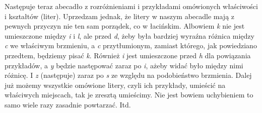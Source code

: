 \documentclass[dvipsnames,12pt]{article}
\begin{document}
Następuje teraz abecadło z rozróżnieniami i przykładami
omówionych właściwości i kształtów (liter). Uprzedzam jednak, że
litery w naszym abecadle mają z pewnych przyczyn nie ten sam porządek,
co w łacińskim. Albowiem \textit{k} nie jest umieszczone między
\textit{i} i \textit{l}, ale przed \textit{d}, żeby była bardziej
wyraźna różnica między \textit{c} we właściwym brzmieniu, a \textit{c}
przytłumionym, zamiast którego, jak powiedziano przedtem, będziemy
pisać \textit{k}. Również \textit{i} jest umieszczone przed \textit{h}
dla powiązania przykładów, a \textit{y} będzie następować zaraz po
\textit{i}, ażeby widać było między nimi różnicę. I \textit{z} (następuje)
zaraz po \textit{s} ze względu na podobieństwo brzmienia. Dalej już możemy
wszystkie omówione litery, czyli ich przykłady, umieścić na właściwych
miejscach, tak je zresztą umieścimy. Nie jest bowiem uchybieniem to
samo wiele razy zasadnie powtarzać. Itd.
\end{document}
